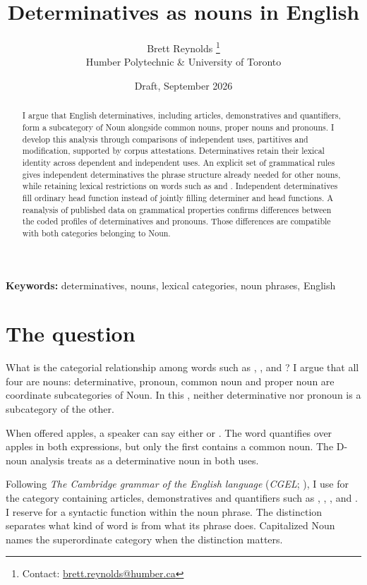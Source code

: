 \documentclass[12pt]{article}
\title{Determinatives as nouns in English}
\author{Brett Reynolds \orcidlink{0000-0003-0073-7195}%
\thanks{Contact: \href{mailto:brett.reynolds@humber.ca}{brett.reynolds@humber.ca}}\\
Humber Polytechnic \& University of Toronto}
\date{Draft, September 2026}
\begin{document}
\maketitle

\begin{abstract}
I argue that English determinatives, including articles, demonstratives and quantifiers, form a subcategory of Noun alongside common nouns, proper nouns and pronouns. I develop this analysis through comparisons of independent uses, partitives and modification, supported by corpus attestations. Determinatives retain their lexical identity across dependent and independent uses. An explicit set of grammatical rules gives independent determinatives the phrase structure already needed for other nouns, while retaining lexical restrictions on words such as  and . Independent determinatives fill ordinary head function instead of jointly filling determiner and head functions. A reanalysis of published data on grammatical properties confirms differences between the coded profiles of determinatives and pronouns. Those differences are compatible with both categories belonging to Noun.
\end{abstract}

\noindent\textbf{Keywords:} determinatives, nouns, lexical categories, noun phrases, English

\section{The question}\label{sec:intro}

What is the categorial relationship among words such as , ,  and ? I argue that all four are nouns: determinative, pronoun, common noun and proper noun are coordinate subcategories of Noun. In this , neither determinative nor pronoun is a subcategory of the other.

When offered apples, a speaker can say either  or . The word  quantifies over apples in both expressions, but only the first contains a common noun. The D-noun analysis treats  as a determinative noun in both uses.

Following \textit{The Cambridge grammar of the English language} (\textit{CGEL}; \citealt{huddleston2002}), I use  for the category containing articles, demonstratives and quantifiers such as , , ,  and . I reserve  for a syntactic function within the noun phrase. The distinction separates what kind of word  is from what its phrase does. Capitalized Noun names the superordinate category when the distinction matters.
\end{document}
